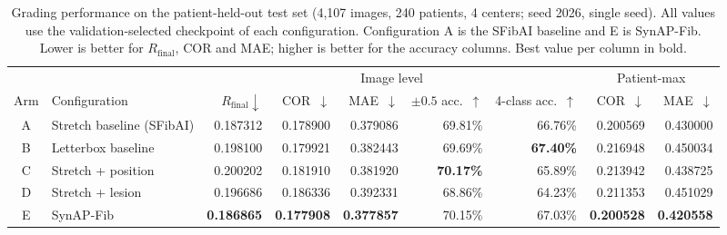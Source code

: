 \begin{table}[!t]
\centering
\caption{Grading performance on the patient-held-out test set (4,107 images,
240 patients, 4 centers; seed 2026, single seed). All values use the
validation-selected checkpoint of each configuration. Configuration A is the
SFibAI baseline and E is SynAP-Fib. Lower is better for $R_{\mathrm{final}}$,
COR and MAE; higher is better for the accuracy columns. Best value per column
in bold.}
\label{tab:main}
\small
\begin{tabular}{@{}clrrrrrrr@{}}
\toprule
 & & \multicolumn{5}{c}{Image level} & \multicolumn{2}{c}{Patient-max} \\
\cmidrule(lr){3-7} \cmidrule(lr){8-9}
Arm & Configuration & $R_{\mathrm{final}}\downarrow$ & COR~$\downarrow$ & MAE~$\downarrow$ & $\pm0.5$ acc.~$\uparrow$ & 4-class acc.~$\uparrow$ & COR~$\downarrow$ & MAE~$\downarrow$ \\
\midrule
A & Stretch baseline (SFibAI) & 0.187312 & 0.178900 & 0.379086 & 69.81\% & 66.76\% & 0.200569 & 0.430000 \\
B & Letterbox baseline & 0.198100 & 0.179921 & 0.382443 & 69.69\% & \textbf{67.40\%} & 0.216948 & 0.450034 \\
C & Stretch + position & 0.200202 & 0.181910 & 0.381920 & \textbf{70.17\%} & 65.89\% & 0.213942 & 0.438725 \\
D & Stretch + lesion & 0.196686 & 0.186336 & 0.392331 & 68.86\% & 64.23\% & 0.211353 & 0.451029 \\
E & SynAP-Fib & \textbf{0.186865} & \textbf{0.177908} & \textbf{0.377857} & 70.15\% & 67.03\% & \textbf{0.200528} & \textbf{0.420558} \\
\bottomrule
\end{tabular}
\end{table}
